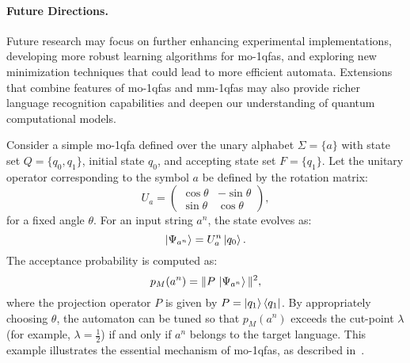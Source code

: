 \paragraph{Future Directions.} Future research may focus on further enhancing experimental implementations, developing more robust learning algorithms for \glspl{mo-1qfa}, and exploring new minimization techniques that could lead to more efficient automata. Extensions that combine features of \glspl{mo-1qfa} and \gls{mm-1qfa}s may also provide richer language recognition capabilities and deepen our understanding of quantum computational models.

\begin{example}    
    Consider a simple \gls{mo-1qfa} defined over the unary alphabet $\Sigma=\{a\}$ with state set $Q=\{q_0,q_1\}$, initial state $q_0$, and accepting state set $F=\{q_1\}$. Let the unitary operator corresponding to the symbol $a$ be defined by the rotation matrix:
    \[
    U_a = \begin{pmatrix}
    \cos\theta & -\sin\theta \\
    \sin\theta & \cos\theta
    \end{pmatrix},
    \]
    for a fixed angle $\theta$. For an input string $a^n$, the state evolves as:
    \[
    \ket{\Psi_{a^n}} = U_a^n \ket{q_0}.
    \]
    The acceptance probability is computed as:
    \[
    p_M(a^n)=\|P\,\ket{\Psi_{a^n}}\|^2,
    \]
    where the projection operator $P$ is given by $P=\ket{q_1}\bra{q_1}$. By appropriately choosing $\theta$, the automaton can be tuned so that $p_M(a^n)$ exceeds the cut-point $\lambda$ (for example, $\lambda=\frac{1}{2}$) if and only if $a^n$ belongs to the target language. This example illustrates the essential mechanism of \glspl{mo-1qfa}, as described in~\cite{moore2000quantum,brodsky2002characterizations}.
    \end{example}
    